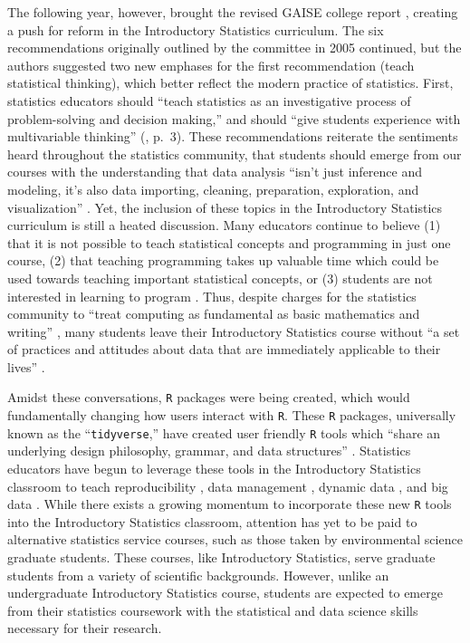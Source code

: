\documentclass[12pt]{article}
\begin{document}
\quad The following year, however, brought the revised GAISE college report 
\citep{gaise}, creating a push for reform in the Introductory Statistics 
curriculum. The six recommendations originally outlined by the committee in 2005
continued, but the authors suggested two new emphases for the first
recommendation (teach statistical thinking), which better reflect the modern
practice of statistics. First, statistics educators should ``teach statistics as
an investigative process of problem-solving and decision making,'' and should 
``give students experience with multivariable thinking'' (\citeyear{gaise}, 
p.\ 3). These recommendations reiterate the sentiments heard throughout the
statistics community, that students should emerge from our courses with the
understanding that data analysis ``isn't just inference and modeling, it's also
data importing, cleaning, preparation, exploration, and visualization'' 
\citep{mine-jsm}. Yet, the inclusion of these topics in the Introductory 
Statistics curriculum is still a heated discussion. Many educators continue to 
believe (1) that it is not possible to teach statistical concepts and 
programming in just one course, (2) that teaching programming takes up valuable
time which could be used towards teaching important statistical concepts, or 
(3) students are not interested in learning to program \citep{mine-jsm}. Thus, 
despite charges for the statistics community to ``treat computing as fundamental
as basic mathematics and writing'' \citep[p.\ 298]{esr}, many students leave
their Introductory Statistics course without ``a set of practices and attitudes
about data that are immediately applicable to their lives'' 
\citep[p.\ 309]{gould}. 

\quad Amidst these conversations, \texttt{R} packages were being created, which 
would fundamentally changing how users interact with \texttt{R}. These 
\texttt{R} packages, universally known as the ``\texttt{tidyverse},'' have 
created user friendly \texttt{R} tools which ``share an underlying design 
philosophy, grammar, and data structures'' \citep{tidyverse}. Statistics 
educators have begun to leverage these tools in the Introductory Statistics 
classroom to teach reproducibility \citep{mine-rmarkdown}, data management 
\citep{horton_takingachance}, dynamic data \citep{hardin-tise}, and big data
\citep{horton-tise}. While there exists a growing momentum to incorporate these
new \texttt{R} tools into the Introductory Statistics classroom, attention has 
yet to be paid to alternative statistics service courses, such as those taken 
by environmental science graduate students. These courses, like Introductory 
Statistics, serve graduate students from a variety of scientific backgrounds. 
However, unlike an undergraduate Introductory Statistics course, students are 
expected to emerge from their statistics coursework with the statistical and 
data science skills necessary for their research. 
\end{document}
